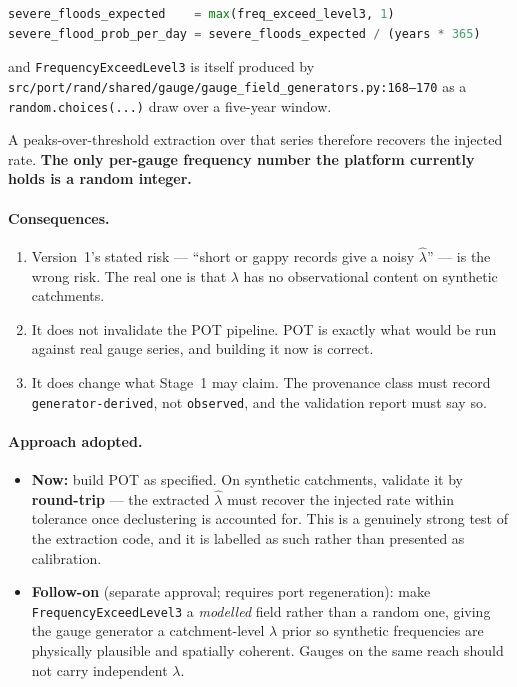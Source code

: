 \documentclass[11pt]{article}
\begin{document}
\begin{lstlisting}[language=Python]
severe_floods_expected    = max(freq_exceed_level3, 1)
severe_flood_prob_per_day = severe_floods_expected / (years * 365)
\end{lstlisting}

\noindent and \texttt{FrequencyExceedLevel3} is itself produced by
\texttt{src/port/rand/shared/gauge/gauge\_field\_generators.py:168--170} as a
\texttt{random.choices(...)} draw over a five-year window.

A peaks-over-threshold extraction over that series therefore recovers the
injected rate. \textbf{The only per-gauge frequency number the platform
currently holds is a random integer.}

\paragraph{Consequences.}
\begin{enumerate}[nosep]
  \item Version~1's stated risk --- ``short or gappy records give a noisy
        $\hat{\lambda}$'' --- is the wrong risk. The real one is that $\lambda$
        has no observational content on synthetic catchments.
  \item It does not invalidate the POT pipeline. POT is exactly what would be
        run against real gauge series, and building it now is correct.
  \item It does change what Stage~1 may claim. The provenance class must record
        \texttt{generator-derived}, not \texttt{observed}, and the validation
        report must say so.
\end{enumerate}

\paragraph{Approach adopted.}
\begin{itemize}[nosep]
  \item \textbf{Now:} build POT as specified. On synthetic catchments, validate
        it by \textbf{round-trip} --- the extracted $\hat{\lambda}$ must recover
        the injected rate within tolerance once declustering is accounted for.
        This is a genuinely strong test of the extraction code, and it is
        labelled as such rather than presented as calibration.
  \item \textbf{Follow-on} (separate approval; requires port regeneration): make
        \texttt{FrequencyExceedLevel3} a \emph{modelled} field rather than a
        random one, giving the gauge generator a catchment-level $\lambda$ prior
        so synthetic frequencies are physically plausible and spatially coherent.
        Gauges on the same reach should not carry independent $\lambda$.
\end{itemize}
\end{document}
